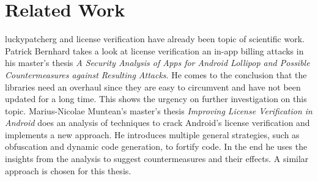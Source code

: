\section{Related Work} \label{subsection:introduction-related}
\gls{luckypatcherg} and license verification have already been topic of scientific work.
\newline
Patrick Bernhard takes a look at license verification an in-app billing attacks in his master's thesis \textit{A Security Analysis of Apps for Android Lollipop and Possible Countermeasures against Resulting Attacks}.
He comes to the conclusion that the libraries need an overhaul since they are easy to circumvent and have not been updated for a long time.
This shows the urgency on further investigation on this topic.
\newline
Marius-Nicolae Muntean's master's thesis \textit{Improving License Verification in Android} does an analysis of techniques to crack Android's license verification and implements a new approach.
He introduces multiple general strategies, such as obfuscation and dynamic code generation, to fortify code.
In the end he uses the insights from the analysis to suggest countermeasures and their effects.
A similar approach is chosen for this thesis.
